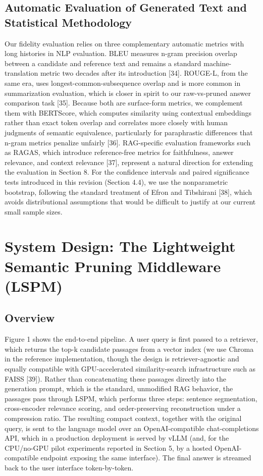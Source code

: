 \subsection{Automatic Evaluation of Generated Text and Statistical Methodology}
Our fidelity evaluation relies on three complementary automatic metrics with long histories in NLP evaluation. BLEU measures n-gram precision overlap between a candidate and reference text and remains a standard machine-translation metric two decades after its introduction [34]. ROUGE-L, from the same era, uses longest-common-subsequence overlap and is more common in summarization evaluation, which is closer in spirit to our raw-vs-pruned answer comparison task [35]. Because both are surface-form metrics, we complement them with BERTScore, which computes similarity using contextual embeddings rather than exact token overlap and correlates more closely with human judgments of semantic equivalence, particularly for paraphrastic differences that n-gram metrics penalize unfairly [36]. RAG-specific evaluation frameworks such as RAGAS, which introduce reference-free metrics for faithfulness, answer relevance, and context relevance [37], represent a natural direction for extending the evaluation in Section 8. For the confidence intervals and paired significance tests introduced in this revision (Section 4.4), we use the nonparametric bootstrap, following the standard treatment of Efron and Tibshirani [38], which avoids distributional assumptions that would be difficult to justify at our current small sample sizes.

\section{System Design: The Lightweight Semantic Pruning Middleware (LSPM)}
\subsection{Overview}
Figure 1 shows the end-to-end pipeline. A user query is first passed to a retriever, which returns the top-k candidate passages from a vector index (we use Chroma in the reference implementation, though the design is retriever-agnostic and equally compatible with GPU-accelerated similarity-search infrastructure such as FAISS [39]). Rather than concatenating these passages directly into the generation prompt, which is the standard, unmodified RAG behavior, the passages pass through LSPM, which performs three steps: sentence segmentation, cross-encoder relevance scoring, and order-preserving reconstruction under a compression ratio. The resulting compact context, together with the original query, is sent to the language model over an OpenAI-compatible chat-completions API, which in a production deployment is served by vLLM (and, for the CPU/no-GPU pilot experiments reported in Section 5, by a hosted OpenAI-compatible endpoint exposing the same interface). The final answer is streamed back to the user interface token-by-token.

